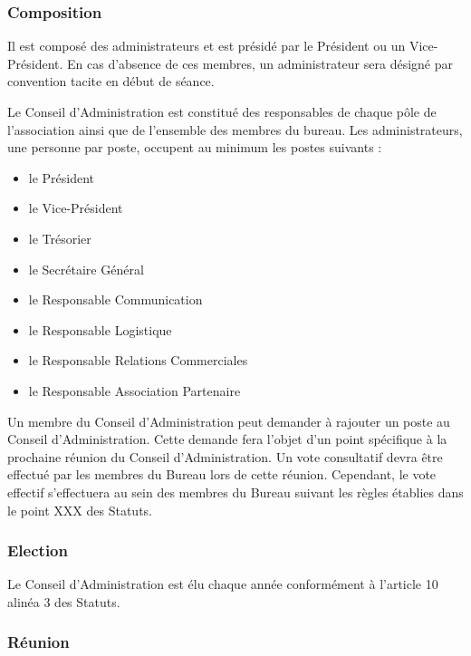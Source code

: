 \documentclass[12pt]{article}
\begin{document}
\subsubsection{Composition}
\label{sec:entites_decisionnelles:conseil_admin:composition}

Il est composé des administrateurs et est présidé par le Président ou un Vice-Président. En cas d’absence de
ces membres, un administrateur sera désigné par convention tacite en début de séance.



Le Conseil d’Administration est constitué des responsables de chaque pôle de l’association ainsi que de
l’ensemble des membres du bureau. Les administrateurs, une personne par poste, occupent au minimum les
postes suivants :
\begin{itemize}
	\item le Président
	\item le Vice-Président
	\item le Trésorier
	\item le Secrétaire Général
	\item le Responsable Communication
	\item le Responsable Logistique
	\item le Responsable Relations Commerciales
	\item le Responsable Association Partenaire
\end{itemize}

Un membre du Conseil d’Administration peut demander à rajouter un poste au Conseil d’Administration.
Cette demande fera l’objet d’un point spécifique à la prochaine réunion du Conseil d’Administration. Un vote
consultatif devra être effectué par les membres du Bureau lors de cette réunion. Cependant, le vote effectif
s’effectuera au sein des membres du Bureau suivant les règles établies dans le point XXX des Statuts.

\subsubsection{Election}
\label{sec:entites_decisionnelles:conseil_admin:election}

Le Conseil d’Administration est élu chaque année conformément à l’article 10 alinéa 3 des Statuts.

\subsubsection{Réunion}
\label{sec:entites_decisionnelles:conseil_admin:reunion}
\end{document}
